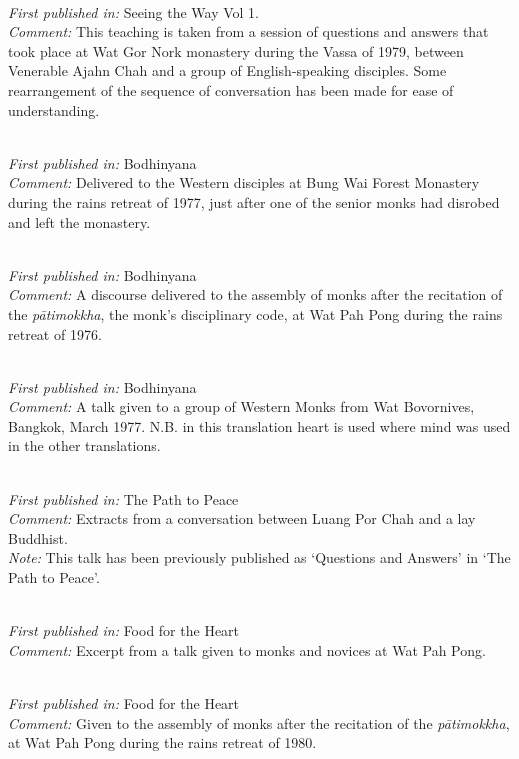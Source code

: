 \\
\textit{First published in:} Seeing the Way Vol 1. \\
\textit{Comment:} This teaching is taken from a session of questions and answers that took place at Wat Gor Nork monastery during the Vassa of 1979, between Venerable Ajahn Chah and a group of English-speaking disciples. Some rearrangement of the sequence of conversation has been made for ease of understanding.

 \\
\textit{First published in:} Bodhinyana \\
\textit{Comment:} Delivered to the Western disciples at Bung Wai Forest Monastery during the rains retreat of 1977, just after one of the senior monks had disrobed and left the monastery.

 \\
\textit{First published in:} Bodhinyana \\
\textit{Comment:} A discourse delivered to the assembly of monks after the recitation of the \textit{p\=ati\-mokkha}, the monk's disciplinary code, at Wat Pah Pong during the rains retreat of 1976.

 \\
\textit{First published in:} Bodhinyana \\
\textit{Comment:} A talk given to a group of Western Monks from Wat Bovornives, Bangkok, March 1977. N.B. in this translation heart is used where mind was used in the other translations.

 \\
\textit{First published in:} The Path to Peace \\
\textit{Comment:} Extracts from a conversation between Luang Por Chah and a lay Buddhist. \\
\textit{Note:} This talk has been previously published as `Questions and Answers' in `The Path to Peace'.

 \\
\textit{First published in:} Food for the Heart \\
\textit{Comment:} Excerpt from a talk given to monks and novices at Wat Pah Pong.

 \\
\textit{First published in:} Food for the Heart \\
\textit{Comment:} Given to the assembly of monks after the recitation of the \textit{p\=ati\-mokkha}, at Wat Pah Pong during the rains retreat of 1980.

